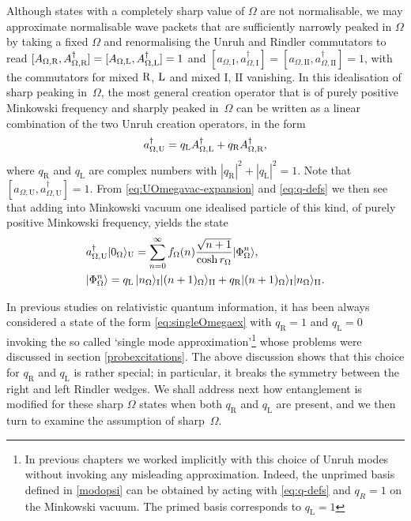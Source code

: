 Although states with a completely sharp value of 
$\Omega$ are not normalisable, 
we may approximate 
normalisable wave packets that are sufficiently narrowly peaked in 
$\Omega$ by taking a fixed $\Omega$ 
and renormalising the Unruh and 
Rindler commutators to read 
$[A_{\Omega,\text{\text{R}}},A^{\dagger}_{\Omega,\text{\text{R}}}]=[A_{\Omega,\text{\text{L}}},A^{\dagger}_{\Omega,\text{\text{L}}}]=1$ and 
$[a_{\Omega,\text{I}},a^{\dagger}_{\Omega,\text{I}}] = [a_{\Omega,\text{II}},a^{\dagger}_{\Omega,\text{II}}]=1$, with the commutators for mixed $\text{\text{R}}$, $\text{\text{L}}$ 
and mixed $\text{I}$, $\text{II}$ vanishing. 
In this idealisation of sharp peaking in~$\Omega$, 
the most general creation operator
that is of purely positive Minkowski frequency and sharply peaked in~$\Omega$ can be written as 
a linear combination of the two Unruh creation operators, in the form 
\begin{align}
\label{eq:q-defs}
a_{\Omega,\text{U}}^\dag = q_{\text{L}} A^\dag_{\Omega,\text{\text{L}}} + q_{\text{R}}  A^\dag_{\Omega,\text{\text{R}}},
\end{align}
where $q_{\text{R}}$ and $q_{\text{L}}$ are complex numbers with 
${|q_{\text{R}}|}^2 + {|q_{\text{L}}|}^2 =1$. Note that 
$[a_{\Omega,\text{U}}, a_{\Omega,\text{U}}^\dag]=1$. 
From 
\eqref{eq:UOmegavac-expansion} and \eqref{eq:q-defs}
we then see that adding into Minkowski vacuum one 
idealised particle
of this kind, of purely positive Minkowski frequency, yields the state 
\begin{align} 
& a^\dag_{\Omega,\text{U}} |0_\Omega\rangle_\text{U} =  
\sum_{n=0}^\infty 
f_{\Omega}(n)\frac{\sqrt{n+1}}{\cosh r_{\Omega}}|\Phi^{n}_{\Omega}\rangle
,  \notag 
\\*
& |\Phi^n _{\Omega}\rangle = 
q_{\text{L}} \, |n_{\Omega}\rangle_\text{I}|(n+1)_{\Omega}\rangle_\text{II} +
q_{\text{R}} |(n+1)_{\Omega}\rangle_\text{I} |n_{\Omega}\rangle_\text{II} . 
\label{eq:singleOmegaex}
\end{align}

In previous studies on relativistic quantum information, it has been always considered a state of the form \eqref{eq:singleOmegaex} with $q_{\text{R}}=1$ and $q_{\text{L}}=0$ invoking the so called `single mode approximation'\footnote{In previous chapters we worked implicitly with this choice of Unruh modes without invoking any misleading approximation. Indeed, the unprimed basis defined in \eqref{modopsi} can be obtained by acting with \eqref{eq:q-defs} and $q_R=1$ on the Minkowski vacuum. The primed basis corresponds to $q_\text{L}=1$} whose problems were discussed in section \ref{probexcitations}. The above discussion shows that this choice for $q_{\text{R}}$ and $q_{\text{L}}$ is rather special; in particular, it breaks the symmetry 
between the right and left Rindler wedges. We shall address next how entanglement is modified for these sharp $\Omega$ states when both $q_{\text{R}}$ and $q_{\text{L}}$ are present, 
and we then turn to examine the assumption of sharp~$\Omega$. 


